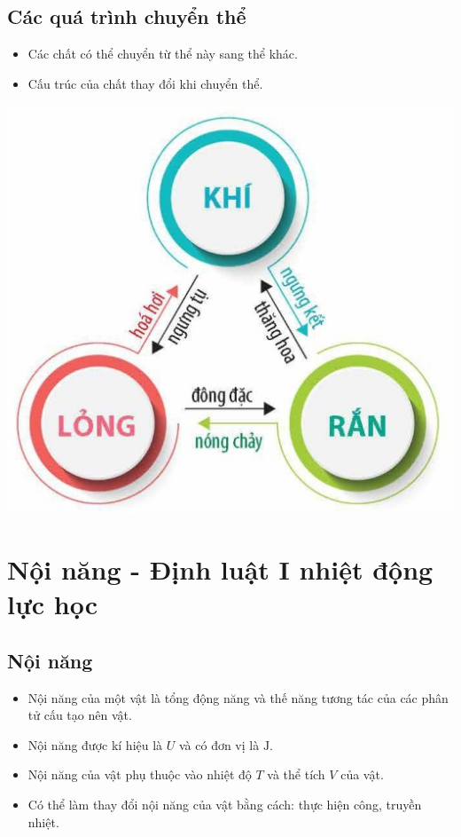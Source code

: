 \subsection{Các quá trình chuyển thể}
\begin{itemize}
	\item Các chất có thể chuyển từ thể này sang thể khác.
	\item Cấu trúc của chất thay đổi khi chuyển thể.
\end{itemize}
\begin{center}
	\includegraphics[width=0.35\linewidth]{../figs/G12C1-4}
\end{center}
\section{Nội năng - Định luật I nhiệt động lực học}
\subsection{Nội năng}
\begin{itemize}
	\item Nội năng của một vật là tổng động năng và thế năng tương tác của các phân tử cấu tạo nên vật.
	\item Nội năng được kí hiệu là $U$ và có đơn vị là $\si{\joule}$.
	\item Nội năng của vật phụ thuộc vào nhiệt độ $T$ và thể tích $V$ của vật.
	\item Có thể làm thay đổi nội năng của vật bằng cách: thực hiện công, truyền nhiệt.
\end{itemize}
